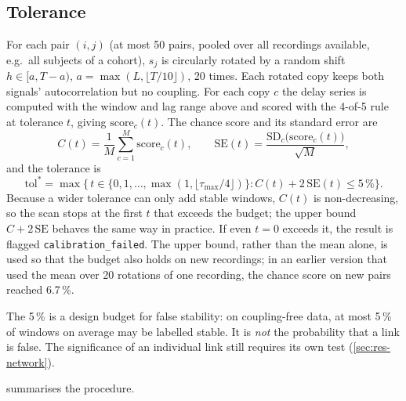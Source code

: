 \documentclass[11pt,a4paper]{article}
\newcommand{\tmax}{\tau_{\max}}
\newcommand{\tol}{\mathrm{tol}}
\begin{document}
\subsection{Tolerance}
\label{sec:tol}
For each pair $(i, j)$ (at most 50 pairs, pooled over all recordings available, e.g.\ all subjects of a cohort), $s_j$ is circularly rotated by a random shift $h \in [a, T - a)$, $a = \max(L, \lfloor T/10 \rfloor)$, 20 times. Each rotated copy keeps both signals' autocorrelation but no coupling. For each copy $c$ the delay series is computed with the window and lag range above and scored with the 4-of-5 rule at tolerance $t$, giving $\mathrm{score}_c(t)$. The chance score and its standard error are
\begin{equation}
C(t) = \frac{1}{M}\sum_{c=1}^{M} \mathrm{score}_c(t), \qquad \mathrm{SE}(t) = \frac{\mathrm{SD}_c\big(\mathrm{score}_c(t)\big)}{\sqrt{M}} ,
\end{equation}
and the tolerance is
\begin{equation}
\tol^\ast = \max\big\{\, t \in \{0, 1, \dots, \max(1, \lfloor\tmax/4\rfloor)\} : C(t) + 2\,\mathrm{SE}(t) \le 5\,\% \big\}.
\label{eq:tol}
\end{equation}
Because a wider tolerance can only add stable windows, $C(t)$ is non-decreasing, so the scan stops at the first $t$ that exceeds the budget; the upper bound $C + 2\,\mathrm{SE}$ behaves the same way in practice. If even $t = 0$ exceeds it, the result is flagged \texttt{calibration\_failed}. The upper bound, rather than the mean alone, is used so that the budget also holds on new recordings; in an earlier version that used the mean over 20 rotations of one recording, the chance score on new pairs reached 6.7\,\%.

The 5\,\% is a design budget for false stability: on coupling-free data, at most 5\,\% of windows on average may be labelled stable. It is \emph{not} the probability that a link is false. The significance of an individual link still requires its own test (\cref{sec:res-network}).

 summarises the procedure.
\end{document}
